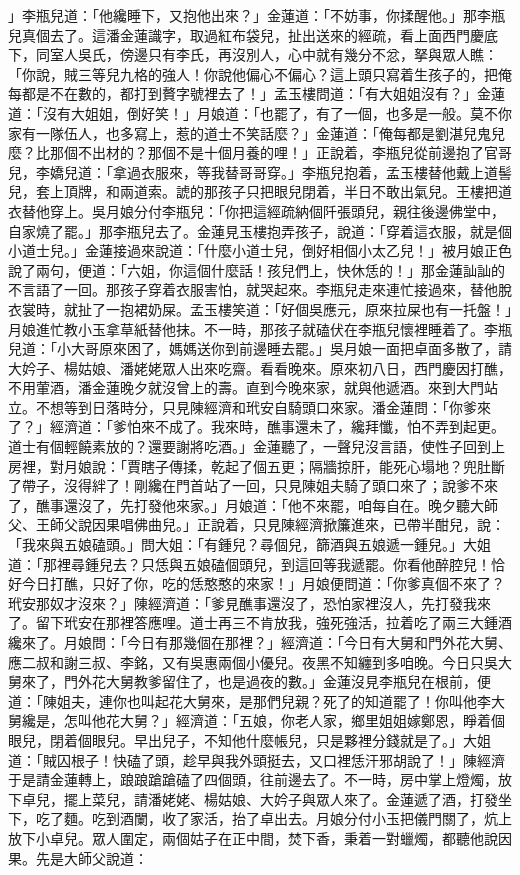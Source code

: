 \begin{showcontents}{}
」李瓶兒道：「他纔睡下，又抱他出來？」金蓮道：「不妨事，你揉醒他。」那李瓶兒真個去了。這潘金蓮識字，取過紅布袋兒，扯出送來的經疏，看上面西門慶底下，同室人吳氏，傍邊只有李氏，再沒別人，心中就有幾分不忿，拏與眾人瞧：「你說，賊三等兒九格的強人！你說他偏心不偏心？這上頭只寫着生孩子的，把俺每都是不在數的，都打到贅字號裡去了！」孟玉樓問道：「有大姐姐沒有？」金蓮道：「沒有大姐姐，倒好笑！」月娘道：「也罷了，有了一個，也多是一般。莫不你家有一隊伍人，也多寫上，惹的道士不笑話麼？」金蓮道：「俺每都是劉湛兒鬼兒麼？比那個不出材的？那個不是十個月養的哩！」正說着，李瓶兒從前邊抱了官哥兒，李嬌兒道：「拿過衣服來，等我替哥哥穿。」李瓶兒抱着，孟玉樓替他戴上道髻兒，套上頂牌，和兩道索。諕的那孩子只把眼兒閉着，半日不敢出氣兒。王樓把道衣替他穿上。吳月娘分付李瓶兒：「你把這經疏納個阡張頭兒，親往後邊佛堂中，自家燒了罷。」那李瓶兒去了。金蓮見玉樓抱弄孩子，說道：「穿着這衣服，就是個小道士兒。」金蓮接過來說道：「什麼小道士兒，倒好相個小太乙兒！」被月娘正色說了兩句，便道：「六姐，你這個什麼話！孩兒們上，快休恁的！」那金蓮訕訕的不言語了一回。那孩子穿着衣服害怕，就哭起來。李瓶兒走來連忙接過來，替他脫衣裳時，就扯了一抱裙奶屎。孟玉樓笑道：「好個吳應元，原來拉屎也有一托盤！」月娘進忙教小玉拿草紙替他抹。不一時，那孩子就磕伏在李瓶兒懷裡睡着了。李瓶兒道：「小大哥原來困了，媽媽送你到前邊睡去罷。」吳月娘一面把卓面多散了，請大妗子、楊姑娘、潘姥姥眾人出來吃齋。看看晚來。原來初八日，西門慶因打醮，不用葷酒，潘金蓮晚夕就沒曾上的壽。直到今晚來家，就與他遞酒。來到大門站立。不想等到日落時分，只見陳經濟和玳安自騎頭口來家。潘金蓮問：「你爹來了？」經濟道：「爹怕來不成了。我來時，醮事還未了，纔拜懺，怕不弄到起更。道士有個輕饒素放的？還要謝將吃酒。」金蓮聽了，一聲兒沒言語，使性子回到上房裡，對月娘說：「賈瞎子傳揉，乾起了個五更；隔牆掠肝，能死心塌地？兜肚斷了帶子，沒得絆了！剛纔在門首站了一回，只見陳姐夫騎了頭口來了；說爹不來了，醮事還沒了，先打發他來家。」月娘道：「他不來罷，咱每自在。晚夕聽大師父、王師父說因果唱佛曲兒。」正說着，只見陳經濟掀簾進來，已帶半酣兒，說：「我來與五娘磕頭。」問大姐：「有鍾兒？尋個兒，篩酒與五娘遞一鍾兒。」大姐道：「那裡尋鍾兒去？只恁與五娘磕個頭兒，到這回等我遞罷。你看他醉腔兒！恰好今日打醮，只好了你，吃的恁憨憨的來家！」月娘便問道：「你爹真個不來了？玳安那奴才沒來？」陳經濟道：「爹見醮事還沒了，恐怕家裡沒人，先打發我來了。留下玳安在那裡答應哩。道士再三不肯放我，強死強活，拉着吃了兩三大鍾酒纔來了。月娘問：「今日有那幾個在那裡？」經濟道：「今日有大舅和門外花大舅、應二叔和謝三叔、李銘，又有吳惠兩個小優兒。夜黑不知纏到多咱晚。今日只吳大舅來了，門外花大舅教爹留住了，也是過夜的數。」金蓮沒見李瓶兒在根前，便道：「陳姐夫，連你也叫起花大舅來，是那們兒親？死了的知道罷了！你叫他李大舅纔是，怎叫他花大舅？」經濟道：「五娘，你老人家，鄉里姐姐嫁鄭恩，睜着個眼兒，閉着個眼兒。早出兒子，不知他什麼帳兒，只是夥裡分錢就是了。」大姐道：「賊囚根子！快磕了頭，趁早與我外頭挺去，又口裡恁汗邪胡說了！」陳經濟于是請金蓮轉上，踉踉蹌蹌磕了四個頭，往前邊去了。不一時，房中掌上燈燭，放下卓兒，擺上菜兒，請潘姥姥、楊姑娘、大妗子與眾人來了。金蓮遞了酒，打發坐下，吃了麵。吃到酒闌，收了家活，抬了卓出去。月娘分付小玉把儀門關了，炕上放下小卓兒。眾人圍定，兩個姑子在正中間，焚下香，秉着一對蠟燭，都聽他說因果。先是大師父說道：


\end{showcontents}
